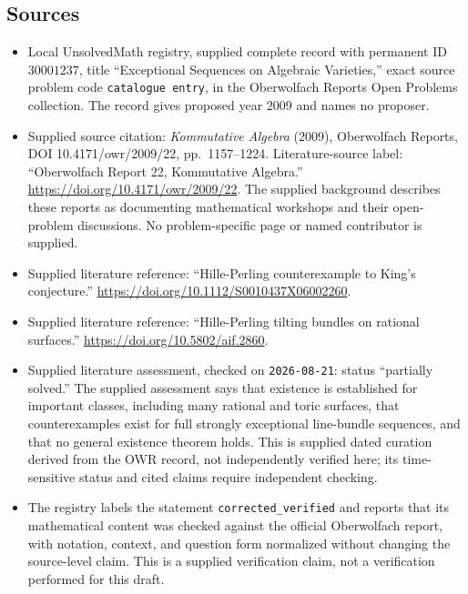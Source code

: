 \documentclass[11pt]{article}
\begin{document}
\subsection{Sources}
\begin{itemize}
\item Local UnsolvedMath registry, supplied complete record with permanent ID \(30001237\), title ``Exceptional Sequences on Algebraic Varieties,'' exact source problem code \texttt{catalogue entry}, in the Oberwolfach Reports Open Problems collection. The record gives proposed year \(2009\) and names no proposer.
\item Supplied source citation: \emph{Kommutative Algebra} (2009), Oberwolfach Reports, DOI 10.4171/owr/2009/22, pp.\ 1157--1224. Literature-source label: ``Oberwolfach Report 22, Kommutative Algebra.'' \url{https://doi.org/10.4171/owr/2009/22}. The supplied background describes these reports as documenting mathematical workshops and their open-problem discussions. No problem-specific page or named contributor is supplied.
\item Supplied literature reference: ``Hille-Perling counterexample to King's conjecture.'' \url{https://doi.org/10.1112/S0010437X06002260}.
\item Supplied literature reference: ``Hille-Perling tilting bundles on rational surfaces.'' \url{https://doi.org/10.5802/aif.2860}.
\item Supplied literature assessment, checked on \texttt{2026-08-21}: status ``partially solved.'' The supplied assessment says that existence is established for important classes, including many rational and toric surfaces, that counterexamples exist for full strongly exceptional line-bundle sequences, and that no general existence theorem holds. This is supplied dated curation derived from the OWR record, not independently verified here; its time-sensitive status and cited claims require independent checking.
\item The registry labels the statement \texttt{corrected\_verified} and reports that its mathematical content was checked against the official Oberwolfach report, with notation, context, and question form normalized without changing the source-level claim. This is a supplied verification claim, not a verification performed for this draft.
\end{itemize}
\end{document}
